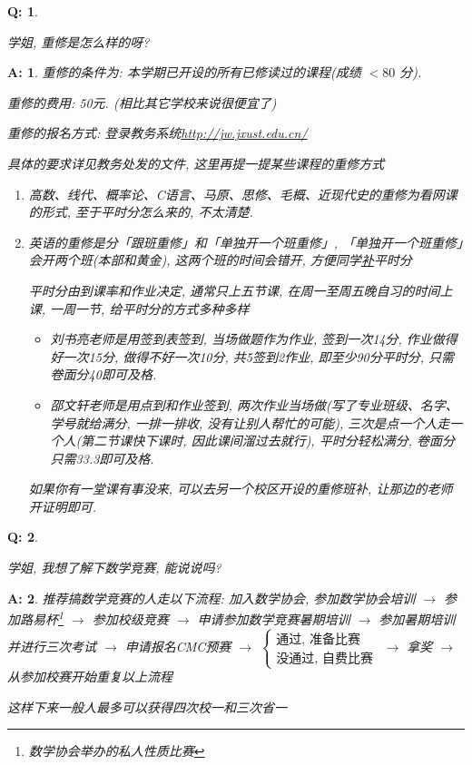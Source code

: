 \documentclass[UTF8]{ctexart}
\theoremstyle{nonumberplain}
\newtheorem{Q}{Q:}
\theoremstyle{nonumberplain}
\newtheorem{A}{A:}
\newcommand{\FAQ}[2]{
    \begin{Q}
        #1
    \end{Q}
    \begin{A}
        #2
    \end{A}
}
\begin{document}
    \FAQ{\hypertarget{7}{学姐, 重修是怎么样的呀?}}{
        重修的条件为: 本学期已开设的所有已修读过的课程(成绩 $<80$ 分).

        重修的费用: 50元. (相比其它学校来说很便宜了)

        重修的报名方式: 登录教务系统\url{http://jw.jxust.edu.cn/}

        具体的要求详见教务处发的文件, 这里再提一提某些课程的重修方式
        \begin{enumerate}
            \item 高数、线代、概率论、C语言、马原、思修、毛概、近现代史的重修为看网课的形式, 至于平时分怎么来的, 不太清楚.
            \item 英语的重修是分「跟班重修」和「单独开一个班重修」, 「单独开一个班重修」会开两个班(本部和黄金), 这两个班的时间会错开, 方便同学\hyperlink{1.1}{补}平时分
            
            平时分由到课率和作业决定, 通常只上五节课, 在周一至周五晚自习的时间上课, 一周一节, 给平时分的方式多种多样
            \begin{itemize}
                \item 刘书亮老师是用签到表签到, 当场做题作为作业, 签到一次14分, 作业做得好一次15分, 做得不好一次10分, 共5签到2作业, 即至少90分平时分, 只需卷面分40即可及格.
                \item 邵文轩老师是用点到和作业签到, 两次作业当场做(写了专业班级、名字、学号就给满分, 一排一排收, 没有让别人帮忙的可能), 三次是点一个人走一个人(第二节课快下课时, 因此课间溜过去就行), 平时分轻松满分, 卷面分只需33.3即可及格.
            \end{itemize}
            如果你有一堂课有事没来, 可以去另一个校区开设的重修班\hypertarget{1.1}{补}, 让那边的老师开证明即可.
        \end{enumerate}
    }

    \FAQ{\hypertarget{8}{学姐, 我想了解下数学竞赛, 能说说吗?}}{
        推荐搞数学竞赛的人走以下流程: 加入数学协会, 参加数学协会培训 $\to$ 参加路易杯\footnote{数学协会举办的私人性质比赛} $\to$ 参加校级竞赛 $\to$ 申请参加数学竞赛暑期培训 $\to$ 参加暑期培训并进行三次考试 $\to$ 申请报名CMC预赛 $\to$ $\begin{cases}
            \text{通过, 准备比赛}\\
            \text{没通过, 自费比赛}
        \end{cases}$ $\to$ 拿奖 $\to$ 从参加校赛开始重复以上流程

        这样下来一般人最多可以获得四次校一和三次省一
    }
\end{document}

